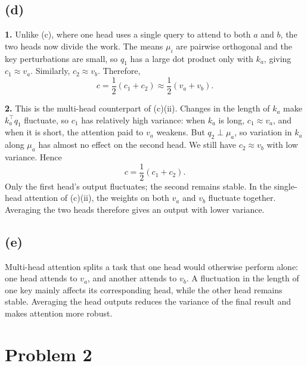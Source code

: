 \documentclass[a4paper,10pt]{article}
\begin{document}
\subsection{(d)}
\noindent\textbf{1.} Unlike (c), where one head uses a single query to attend to both \(a\) and \(b\), the two heads now divide the work. The means \(\mu_i\) are pairwise orthogonal and the key perturbations are small, so \(q_1\) has a large dot product only with \(k_a\), giving \(c_1\approx v_a\). Similarly, \(c_2\approx v_b\). Therefore,
\[
c=\frac{1}{2}(c_1+c_2)\approx\frac{1}{2}(v_a+v_b).
\]

\noindent\textbf{2.} This is the multi-head counterpart of (c)(ii). Changes in the length of \(k_a\) make \(k_a^\top q_1\) fluctuate, so \(c_1\) has relatively high variance: when \(k_a\) is long, \(c_1\approx v_a\), and when it is short, the attention paid to \(v_a\) weakens. But \(q_2\perp\mu_a\), so variation in \(k_a\) along \(\mu_a\) has almost no effect on the second head. We still have \(c_2\approx v_b\) with low variance. Hence
\[
c=\frac{1}{2}(c_1+c_2).
\]
Only the first head's output fluctuates; the second remains stable. In the single-head attention of (c)(ii), the weights on both \(v_a\) and \(v_b\) fluctuate together. Averaging the two heads therefore gives an output with lower variance.

\subsection{(e)}
Multi-head attention splits a task that one head would otherwise perform alone: one head attends to \(v_a\), and another attends to \(v_b\). A fluctuation in the length of one key mainly affects its corresponding head, while the other head remains stable. Averaging the head outputs reduces the variance of the final result and makes attention more robust.

\section{Problem 2}
\end{document}
